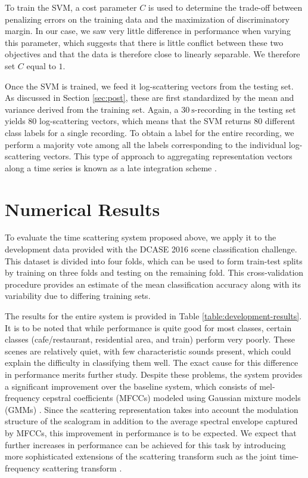 \documentclass{article}
\begin{document}
\begin{sloppy}
To train the SVM, a cost parameter $C$ is used to determine the trade-off between penalizing errors on the training data and the maximization of discriminatory margin. In our case, we saw very little difference in performance when varying this parameter, which suggests that there is little conflict between these two objectives and that the data is therefore close to linearly separable. We therefore set $C$ equal to $1$.

Once the SVM is trained, we feed it log-scattering vectors from the testing set. As discussed in Section \ref{sec:post}, these are first standardized by the mean and variance derived from the training set. Again, a $30~\mathrm{s}$-recording in the testing set yields $80$ log-scattering vectors, which means that the SVM returns $80$ different class labels for a single recording. To obtain a label for the entire recording, we perform a majority vote among all the labels corresponding to the individual log-scattering vectors. This type of approach to aggregating representation vectors along a time series is known as a late integration scheme \cite{kittler}.

\section{Numerical Results}
\label{sec:results}

To evaluate the time scattering system proposed above, we apply it to the development data provided with the DCASE 2016 scene classification challenge. This dataset is divided into four folds, which can be used to form train-test splits by training on three folds and testing on the remaining fold. This cross-validation procedure provides an estimate of the mean classification accuracy along with its variability due to differing training sets.

The results for the entire system is provided in Table \ref{table:development-results}. It is to be noted that while performance is quite good for most classes, certain classes (\textsf{cafe/restaurant}, \textsf{residential area}, and \textsf{train}) perform very poorly. These scenes are relatively quiet, with few characteristic sounds present, which could explain the difficulty in classifying them well. The exact cause for this difference in performance merits further study. Despite these problems, the system provides a significant improvement over the baseline system, which consists of mel-frequency cepstral coefficients (MFCCs) modeled using Gaussian mixture models (GMMs) \cite{heittola}. Since the scattering representation takes into account the modulation structure of the scalogram in addition to the average spectral envelope captured by MFCCs, this improvement in performance is to be expected. We expect that further increases in performance can be achieved for this task by introducing more sophisticated extensions of the scattering transform such as the joint time-frequency scattering transform \cite{joint}.


\end{sloppy}
\end{document}
